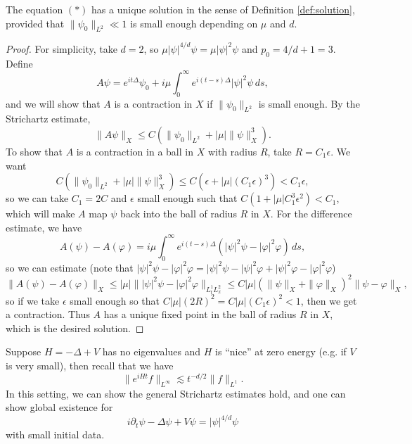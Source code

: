 \begin{corollary}
  The equation $(*)$ has a unique
  solution in the sense of Definition \ref{def:solution},
  provided that $\|\psi_0\|_{L^2} \ll 1$
  is small enough depending on $\mu$ and $d$.
\end{corollary}

\begin{proof}
  For simplicity, take $d = 2$, so
  $\mu |\psi|^{4 / d} \psi = \mu |\psi|^2 \psi$
  and $p_0 = 4 / d + 1 = 3$. Define
  \[
    A \psi
    = e^{it\Delta} \psi_0 + i \mu \int_0^\infty
    e^{i(t - s)\Delta} |\psi|^2 \psi\, ds,
  \]
  and we will show that $A$ is a contraction
  in $X$ if
  $\|\psi_0\|_{L^2}$ is small enough.
  By the Strichartz estimate,
  \[
    \|A\psi\|_{X}
    \le C(\|\psi_0\|_{L^2} + |\mu| \|\psi\|_{X}^3).
  \]
  To show that $A$ is a contraction in a
  ball in $X$ with radius $R$, take
  $R = C_1 \epsilon$. We want
  \[
    C(\|\psi_0\|_{L^2} + |\mu| \|\psi\|_{X}^3)
    \le C(\epsilon + |\mu| (C_1 \epsilon)^3)
    < C_1 \epsilon,
  \]
  so we can take $C_1 = 2C$ and $\epsilon$
  small enough such that
  $C(1 + |\mu| C_1^3 \epsilon^2) < C_1$,
  which will make $A$ map $\psi$ back into
  the ball of radius $R$ in $X$. For the
  difference estimate, we have
  \[
    A(\psi) - A(\varphi)
    = i \mu \int_0^\infty e^{i(t - s)\Delta}
    (|\psi|^2 \psi - |\varphi|^2 \varphi)\, ds,
  \]
  so we can estimate (note that
  $|\psi|^2 \psi - |\varphi|^2 \varphi = |\psi|^2 \psi - |\psi|^2 \varphi + |\psi|^2 \varphi - |\varphi|^2 \varphi$)
  \[
    \|A(\psi) - A(\varphi)\|_{X}
    \le |\mu| \| |\psi|^2 \psi - |\varphi|^2 \varphi\|_{L^1_t L^2_x}
    \le C |\mu| (\|\psi\|_X + \|\varphi\|_X)^2 \|\psi - \varphi\|_X,
  \]
  so if we take $\epsilon$ small enough so that
  $C |\mu|(2R)^2 = C|\mu| (C_1 \epsilon)^2 < 1$, then we
  get a contraction. Thus $A$ has a unique
  fixed point in the ball of radius $R$ in
  $X$, which is the desired solution.
\end{proof}

\begin{remark}
  Suppose $H = -\Delta + V$ has no eigenvalues
  and $H$ is ``nice'' at zero energy (e.g.
  if $V$ is very small), then recall that
  we have
  \[
    \|e^{iHt} f\|_{L^\infty}
    \lesssim t^{-d / 2} \|f\|_{L^1}.
  \]
  In this setting, we can show
  the general Strichartz estimates hold, and
  one can show global existence for
  \[
    i \partial_t \psi - \Delta \psi + V \psi
    = |\psi|^{4 / d} \psi
  \]
  with small initial data.
\end{remark}
